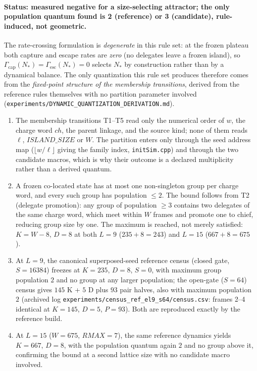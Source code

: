 \documentclass[a4paper]{article}
\begin{document}
\paragraph{Status: measured negative for a size-selecting attractor; the only population quantum found is 2 (reference) or 3 (candidate), rule-induced, not geometric.}
The rate-crossing formulation is \emph{degenerate} in this rule set: at the frozen plateau both capture and escape rates are \emph{zero} (no delegates leave a frozen island), so $\Gamma_{\mathrm{cap}}(N_*) = \Gamma_{\mathrm{esc}}(N_*) = 0$ selects $N_*$ by construction rather than by a dynamical balance. The only quantization this rule set produces therefore comes from the \emph{fixed-point structure of the membership transitions}, derived from the reference rules themselves with no partition parameter involved (\texttt{experiments/DYNAMIC\_QUANTIZATION\_DERIVATION.md}).
\begin{enumerate}
\item The membership transitions T1--T5 read only the numerical order of $w$, the charge word $ch$, the parent linkage, and the source kind; none of them reads $\ell$, $ISLAND\_SIZE$ or $W$. The partition enters only through the seed address map ($\lfloor w/\ell\rfloor$ giving the family index, \texttt{initSim.cpp}) and through the two candidate macros, which is why their outcome is a declared multiplicity rather than a derived quantum.
\item A frozen co-located state has at most one non-singleton group per charge word, and every such group has population $\le 2$. The bound follows from T2 (delegate promotion): any group of population $\ge 3$ contains two delegates of the same charge word, which meet within $W$ frames and promote one to chief, reducing group size by one. The maximum is reached, not merely satisfied: $K = W - 8$, $D = 8$ at both $L = 9$ ($235 + 8 = 243$) and $L = 15$ ($667 + 8 = 675$).
\item At $L = 9$, the canonical superposed-seed reference census (closed gate, $S = 16384$) freezes at $K = 235$, $D = 8$, $S = 0$, with maximum group population $2$ and no group at any larger population; the open-gate ($S = 64$) census gives $145$ K + $5$ D plus $93$ pair halves, also with maximum population $2$ (archived log \texttt{experiments/census\_ref\_el9\_s64/census.csv}: frames 2--4 identical at $K=145$, $D=5$, $P=93$). Both are reproduced exactly by the reference build.
\item At $L = 15$ ($W = 675$, $RMAX = 7$), the same reference dynamics yields $K = 667$, $D = 8$, with the population quantum again $2$ and no group above it, confirming the bound at a second lattice size with no candidate macro involved.
\end{enumerate}
\end{document}
